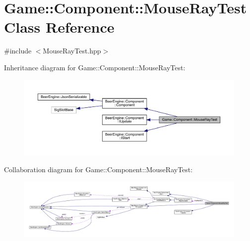 \hypertarget{class_game_1_1_component_1_1_mouse_ray_test}{}\section{Game\+:\+:Component\+:\+:Mouse\+Ray\+Test Class Reference}
\label{class_game_1_1_component_1_1_mouse_ray_test}


{\ttfamily \#include $<$Mouse\+Ray\+Test.\+hpp$>$}



Inheritance diagram for Game\+:\+:Component\+:\+:Mouse\+Ray\+Test\+:
\nopagebreak
\begin{figure}[H]
\begin{center}
\leavevmode
\includegraphics[width=350pt]{class_game_1_1_component_1_1_mouse_ray_test__inherit__graph}
\end{center}
\end{figure}


Collaboration diagram for Game\+:\+:Component\+:\+:Mouse\+Ray\+Test\+:
\nopagebreak
\begin{figure}[H]
\begin{center}
\leavevmode
\includegraphics[width=350pt]{class_game_1_1_component_1_1_mouse_ray_test__coll__graph}
\end{center}
\end{figure}
